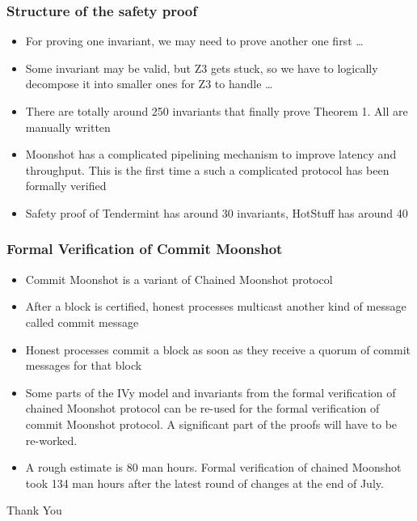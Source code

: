 \documentclass{beamer}
\begin{document}
\begin{frame}
    \frametitle{Structure of the safety proof}
    \begin{itemize}
        \item For proving one invariant, we may need to prove another
            one first \dots
            \pause
            \vfill
        \item Some invariant may be valid, but Z3 gets stuck, so we
            have to logically decompose it into smaller ones for Z3 to
            handle \dots
            \pause
            \vfill
        \item There are totally around 250 invariants that finally
            prove Theorem 1. All are manually written
            \pause
            \vfill
        \item Moonshot has a complicated pipelining mechanism to
            improve latency and throughput. This is the first time a
            such a complicated protocol has been formally verified
            \pause
            \vfill
        \item Safety proof of Tendermint has around 30 invariants,
            HotStuff has around 40
    \end{itemize}
\end{frame}
\begin{frame}
    \frametitle{Formal Verification of Commit Moonshot}
    \begin{itemize}
        \item Commit Moonshot is a variant of Chained Moonshot
            protocol
            \pause
            \vfill
        \item After a block is certified, honest processes multicast
            another kind of message called commit message
            \pause
            \vfill
        \item Honest processes commit a block as soon as they receive
            a quorum of commit messages for that block
            \pause
            \vfill
        \item Some parts of the IVy model and invariants from the
            formal verification of chained Moonshot protocol can be
            re-used for the formal verification of commit Moonshot
            protocol. A significant part of the proofs will have to be
            re-worked.
            \pause
            \vfill
        \item A rough estimate is 80 man hours. Formal verification of
            chained Moonshot took 134 man hours after the latest
            round of changes at the end of July.
    \end{itemize}
    \pause
    \vfill
    \begin{center}
        \Large{Thank You}
    \end{center}
\end{frame}
\end{document}
